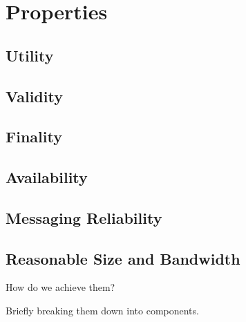 \section{Properties}

 \subsection{Utility}

 \subsection{Validity}

 \subsection{Finality}

 \subsection{Availability}

 \subsection{Messaging Reliability}

 \subsection{Reasonable Size and Bandwidth}

 How do we achieve them?

 Briefly breaking them down into components.
